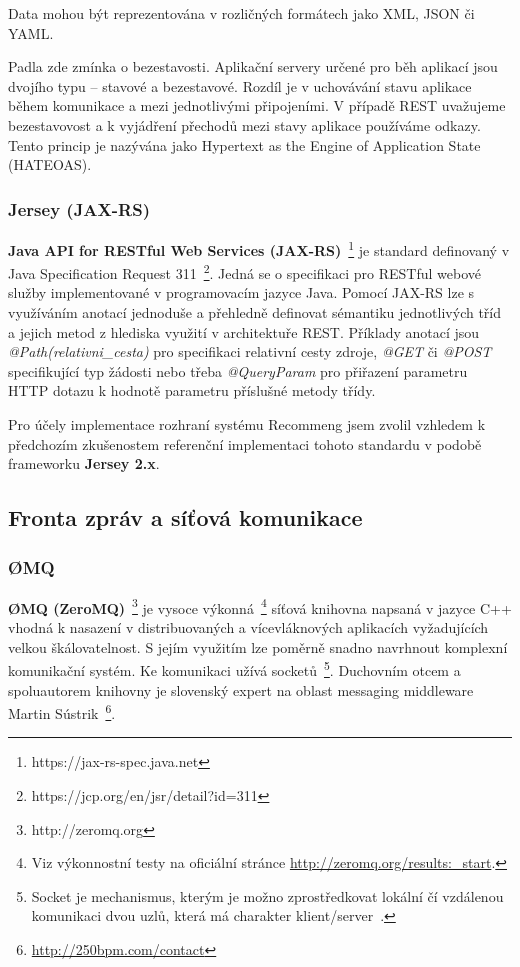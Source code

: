\documentclass[thesis=M,czech]{FITthesis}[2014/05/07]
\begin{document}
Data mohou být reprezentována v rozličných formátech jako XML, JSON či YAML.

Padla zde zmínka o bezestavosti. Aplikační servery určené pro běh aplikací jsou dvojího typu – stavové a bezestavové. Rozdíl je v uchovávání stavu aplikace během komunikace a mezi jednotlivými připojeními. V případě REST uvažujeme bezestavovost a k vyjádření přechodů mezi stavy aplikace používáme odkazy. Tento princip je nazývána jako Hypertext as the Engine of Application State (HATEOAS). 

\subsubsection{Jersey (JAX-RS)}
\textbf{Java API for RESTful Web Services (JAX-RS)}~\footnote{https://jax-rs-spec.java.net} je standard definovaný v Java Specification Request 311~\footnote{https://jcp.org/en/jsr/detail?id=311}. Jedná se o specifikaci pro RESTful webové služby implementované v programovacím jazyce Java. Pomocí JAX-RS lze s využíváním anotací jednoduše a přehledně definovat sémantiku jednotlivých tříd a jejich metod z hlediska využití v architektuře REST. Příklady anotací jsou \emph{@Path(relativni\_cesta)} pro specifikaci relativní cesty zdroje, \emph{@GET} či \emph{@POST} specifikující typ žádosti nebo třeba \emph{@QueryParam} pro přiřazení parametru HTTP dotazu k hodnotě parametru příslušné metody třídy.

Pro účely implementace rozhraní systému Recommeng jsem zvolil vzhledem k předchozím zkušenostem referenční implementaci tohoto standardu v podobě frameworku \textbf{Jersey 2.x}. 

\subsection{Fronta zpráv a síťová komunikace}

\subsubsection{ØMQ}
\textbf{ØMQ (ZeroMQ)}~\footnote{http://zeromq.org} je vysoce výkonná~\footnote{Viz výkonnostní testy na oficiální stránce \url{http://zeromq.org/results:_start}.} síťová knihovna napsaná v jazyce C++ vhodná k nasazení v distribuovaných a vícevláknových aplikacích vyžadujících velkou škálovatelnost. S jejím využitím lze poměrně snadno navrhnout komplexní komunikační systém. Ke komunikaci užívá socketů~\footnote{Socket je mechanismus, kterým je možno zprostředkovat lokální čí vzdálenou komunikaci dvou uzlů, která má charakter klient/server~\cite{socket}.}. Duchovním otcem a spoluautorem knihovny je slovenský expert na oblast messaging middleware Martin Sústrik~\footnote{\url{http://250bpm.com/contact}}.
\end{document}
